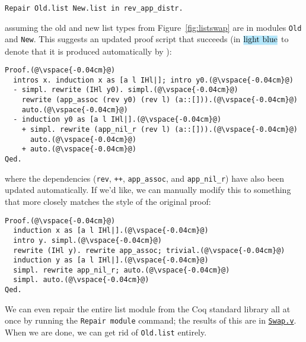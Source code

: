 \begin{lstlisting}
Repair Old.list New.list in rev_app_distr.
\end{lstlisting}
assuming the old and new list types from Figure~\ref{fig:listswap} are in modules \lstinline{Old} and \lstinline{New}.
This suggests an updated proof script that succeeds (in $\codeauto{light blue}$ to denote that it is produced automatically
by \toolname):

\begin{lstlisting}[backgroundcolor=\color{cyan!30}]
Proof.(@\vspace{-0.04cm}@)
  intros x. induction x as [a l IHl|]; intro y0.(@\vspace{-0.04cm}@)
  - simpl. rewrite (IHl y0). simpl.(@\vspace{-0.04cm}@)
    rewrite (app_assoc (rev y0) (rev l) (a::[])).(@\vspace{-0.04cm}@)
    auto.(@\vspace{-0.04cm}@)
  - induction y0 as [a l IHl|].(@\vspace{-0.04cm}@)
    + simpl. rewrite (app_nil_r (rev l) (a::[])).(@\vspace{-0.04cm}@)
      auto.(@\vspace{-0.04cm}@)
    + auto.(@\vspace{-0.04cm}@)
Qed.
\end{lstlisting}
where the dependencies (\lstinline{rev}, \lstinline{++}, \lstinline{app_assoc}, and \lstinline{app_nil_r}) have
also been updated automatically.
If we'd like, we can manually modify this to something that more closely matches the style of the original proof:

\begin{lstlisting}
Proof.(@\vspace{-0.04cm}@)
  induction x as [a l IHl|].(@\vspace{-0.04cm}@)
  intro y. simpl.(@\vspace{-0.04cm}@)
  rewrite (IHl y). rewrite app_assoc; trivial.(@\vspace{-0.04cm}@)
  induction y as [a l IHl|].(@\vspace{-0.04cm}@)
  simpl. rewrite app_nil_r; auto.(@\vspace{-0.04cm}@)
  simpl. auto.(@\vspace{-0.04cm}@)
Qed.
\end{lstlisting}
We can even repair the entire list module from the Coq standard library all at once by running the \lstinline{Repair module}
command; the results of this are in \href{https://github.com/uwplse/pumpkin-pi/blob/master/plugin/coq/Swap.v}{\lstinline{Swap.v}}.
When we are done, we can get rid of \lstinline{Old.list} entirely.

